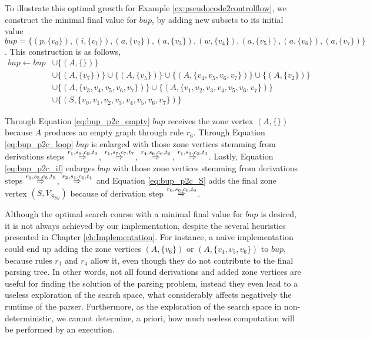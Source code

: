 To illustrate this optimal growth for Example \ref{ex:pseudocode2controlflow}, we construct the minimal final value for $bup$, by adding new subsets to its initial value $bup = \{ (p,\{v_0\}), (i,\{v_1\}), (a,\{v_2\}), (a,\{v_3\}), (w,\{v_4\}), (a,\{v_5\}), (a,\{v_6\}), (a,\{v_7\}) \}$. This construction is as follows,
\begin{align}
	\label{eq:bup_p2c_empty}
	bup \gets bup & \cup \{ (A, \{\}) \} \\
	\label{eq:bup_p2c_loop}
	& \cup \{ (A,\{v_7\}) \} \cup \{ (A,\{v_5\}) \} \cup \{ (A,\{v_4,v_5,v_6,v_7\}) \} \cup \{ (A,\{v_2\}) \} \\
	\label{eq:bup_p2c_if}
	& \cup \{ (A,\{v_3,v_4,v_5,v_6,v_7\}) \} \cup \{ (A, \{v_1,v_2,v_3,v_4,v_5,v_6,v_7\}) \} \\
	\label{eq:bup_p2c_S}
	& \cup \{ (S, \{v_0,v_1,v_2,v_3,v_4,v_5,v_6,v_7\}) \}
\end{align}

Through Equation \ref{eq:bup_p2c_empty} $bup$ receives the zone vertex $(A, \{\})$ because $A$ produces an empty graph through rule $r_6$. Through Equation \ref{eq:bup_p2c_loop} $bup$ is enlarged with those zone vertices stemming from derivations steps $\tderiv{r_1}{s_9,c_9,t_9}{}$, $\tderiv{r_1}{s_7,c_7,t_7}{}$, $\tderiv{r_4}{s_6,c_6,t_6}{}$, $\tderiv{r_1}{s_3,c_3,t_3}{}$. Lastly, Equation \ref{eq:bup_p2c_if} enlarges $bup$ with those zone vertices stemming from derivations steps $\tderiv{r_1}{s_5,c_5,t_5}{}$, $\tderiv{r_2}{s_1,c_1,t_1}{}$ and Equation \ref{eq:bup_p2c_S} adds the final zone vertex $(S, V_{S_{TG}})$ because of derivation step $\tderiv{r_0}{s_0,c_0,t_0}{}$.

Although the optimal search course with a minimal final value for $bup$ is desired, it is not always achieved by our implementation, despite the several heuristics presented in Chapter \ref{ch:Implementation}. For instance, a naive implementation could end up adding the zone vertices $(A,\{v_6\})$ or $(A,\{v_4,v_5,v_6\}) $ to $bup$, because rules $r_1$ and $r_4$ allow it, even though they do not contribute to the final parsing tree. In other words, not all found derivations and added zone vertices are useful for finding the solution of the parsing problem, instead they even lead to a useless exploration of the search space, what considerably affects negatively the runtime of the parser. Furthermore, as the exploration of the search space in non-deterministic, we cannot determine, a priori, how much useless computation will be performed by an execution.

